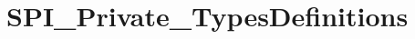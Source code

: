 \hypertarget{group___s_p_i___private___types_definitions}{\section{S\-P\-I\-\_\-\-Private\-\_\-\-Types\-Definitions}
\label{group___s_p_i___private___types_definitions}
}

